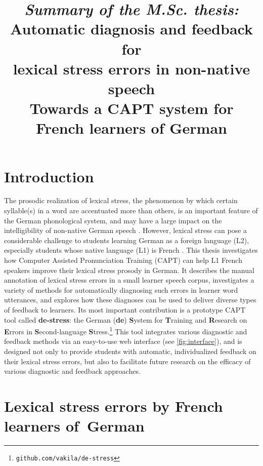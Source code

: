 \documentclass[11pt,a4paper,onecolumn]{article}
\title{{\large \textit{Summary of the M.Sc. thesis:}}\\
\textbf{Automatic diagnosis and feedback for\\lexical stress errors in non-native speech}\\
{\Large Towards a CAPT system for French learners of German}}
\date{}
\begin{document}
\maketitle

\section{Introduction}

The prosodic realization of lexical stress, the phenomenon by which certain syllable(s) in a word are accentuated more than others, is an important feature of the German phonological system, and may have a large impact on the intelligibility of non-native German speech \citep{Hirschfeld1994}. However, lexical stress can pose a considerable challenge to students learning German as a foreign language (L2), especially students whose native language (L1) is French \citep{Hirschfeld2007}. This thesis investigates how Computer Assisted Pronunciation Training (CAPT) can help L1 French speakers improve their lexical stress prosody in German. It describes the manual annotation of lexical stress errors in a small learner speech corpus, investigates a variety of methods for automatically diagnosing such errors in learner word utterances, and explores how these diagnoses can be used to deliver diverse types of feedback to learners.  Its most important contribution is a prototype CAPT tool called
\textbf{de-stress}: the German (\textbf{de}) \textbf{S}ystem for \textbf{T}raining and \textbf{R}esearch on \textbf{E}rrors in \textbf{S}econd-language \textbf{S}tress.\footnote{\texttt{github.com/vakila/de-stress}} 
%
This tool integrates various diagnostic and feedback methods via an easy-to-use web interface (see \cref{fig:interface}), and is designed not only to provide students with automatic, individualized feedback on their lexical stress errors, but also to facilitate future research on the efficacy of 
various
diagnostic and feedback approaches. %



\section{Lexical stress errors by French learners \mbox{of German}}
\label{sec:lexstress}
\end{document}
